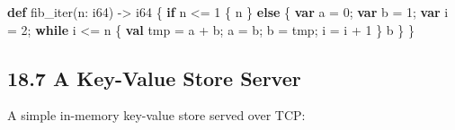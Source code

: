 \documentclass[
  english,
]{book}
\newenvironment{Shaded}{\begin{snugshade}}{\end{snugshade}}
\newcommand{\ControlFlowTok}[1]{\textcolor[rgb]{0.77,0.53,0.75}{\textbf{#1}}}
\newcommand{\DataTypeTok}[1]{\textcolor[rgb]{0.31,0.79,0.69}{#1}}
\newcommand{\DecValTok}[1]{\textcolor[rgb]{0.71,0.81,0.66}{#1}}
\newcommand{\KeywordTok}[1]{\textcolor[rgb]{0.34,0.61,0.84}{\textbf{#1}}}
\newcommand{\NormalTok}[1]{\textcolor[rgb]{0.83,0.83,0.83}{#1}}
\newcommand{\OperatorTok}[1]{\textcolor[rgb]{0.83,0.83,0.83}{#1}}
\begin{document}
\begin{Shaded}
\begin{Highlighting}[]
\KeywordTok{def}\NormalTok{ fib\_iter(n: }\DataTypeTok{i64}\NormalTok{) }\OperatorTok{{-}\textgreater{}} \DataTypeTok{i64}\NormalTok{ \{}
    \ControlFlowTok{if}\NormalTok{ n }\OperatorTok{\textless{}=} \DecValTok{1}\NormalTok{ \{}
\NormalTok{        n}
\NormalTok{    \} }\ControlFlowTok{else}\NormalTok{ \{}
        \KeywordTok{var}\NormalTok{ a }\OperatorTok{=} \DecValTok{0}\NormalTok{;}
        \KeywordTok{var}\NormalTok{ b }\OperatorTok{=} \DecValTok{1}\NormalTok{;}
        \KeywordTok{var}\NormalTok{ i }\OperatorTok{=} \DecValTok{2}\NormalTok{;}
        \ControlFlowTok{while}\NormalTok{ i }\OperatorTok{\textless{}=}\NormalTok{ n \{}
            \KeywordTok{val}\NormalTok{ tmp }\OperatorTok{=}\NormalTok{ a }\OperatorTok{+}\NormalTok{ b;}
\NormalTok{            a }\OperatorTok{=}\NormalTok{ b;}
\NormalTok{            b }\OperatorTok{=}\NormalTok{ tmp;}
\NormalTok{            i }\OperatorTok{=}\NormalTok{ i }\OperatorTok{+} \DecValTok{1}
\NormalTok{        \}}
\NormalTok{        b}
\NormalTok{    \}}
\NormalTok{\}}
\end{Highlighting}
\end{Shaded}

\subsection{18.7 A Key-Value Store
Server}\label{a-key-value-store-server}

A simple in-memory key-value store served over TCP:
\end{document}
